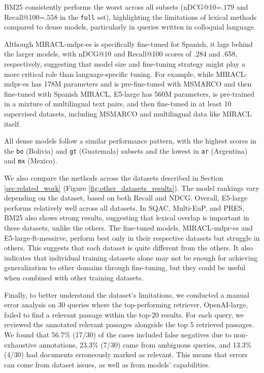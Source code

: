 \documentclass[11pt]{article}
\begin{document}
BM25 consistently performs the worst across all subsets (nDCG@10=$.179$ and Recall@100=$.558$ in the \texttt{full} set), highlighting the limitations of lexical methods compared to dense models, particularly in queries written in colloquial language.

Although MIRACL-mdpr-es is specifically fine-tuned for Spanish, it lags behind the larger models, with nDCG@10 and Recall@100 scores of .284 and .658, respectively, suggesting that model size and fine-tuning strategy might play a more critical role than language-specific tuning. For example, while MIRACL-mdpr-es has 178M parameters and is pre-fine-tuned with MSMARCO and then fine-tuned with Spanish MIRACL, E5-large has 560M parameters, is pre-trained in a mixture of multilingual text pairs, and then fine-tuned in at least 10 supervised datasets, including MSMARCO and multilingual data like MIRACL itself.

All dense models follow a similar performance pattern, with the highest scores in the \texttt{bo} (Bolivia) and \texttt{gt} (Guatemala) subsets and the lowest in \texttt{ar} (Argentina) and \texttt{mx} (Mexico).


We also compare the methods across the datasets described in Section \ref{sec:related_work} (Figure \ref{fig:other_datasets_results}). 
The model rankings vary depending on the dataset, based on both Recall and NDCG. Overall, E5-large performs relatively well across all datasets. 
In SQAC, Multi-EuP, and PRES, BM25 also shows strong results, suggesting that lexical overlap is important in these datasets, unlike the others. 
The fine-tuned models, MIRACL-mdpr-es and E5-large-ft-messirve, perform best only in their respective datasets but struggle in others. 
This suggests that each dataset is quite different from the others.
It also indicates that individual training datasets alone may not be enough for achieving generalization to other domains through fine-tuning, but they could be useful when combined with other training datasets.

Finally, to better understand the dataset's limitations, we conducted a manual error analysis on 30 queries where the top-performing retriever, OpenAI-large, failed to find a relevant passage within the top-20 results.
For each query, we reviewed the annotated relevant passages alongside the top 5 retrieved passages.
We found that 56.7\% (17/30) of the cases included false negatives due to non-exhaustive annotations, 23.3\% (7/30) came from ambiguous queries, and 13.3\% (4/30) had documents erroneously marked as relevant.
This means that errors can come from dataset issues, as well as from models' capabilities.
\end{document}
